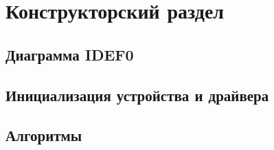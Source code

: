 \section{Конструкторский раздел}

\subsection{Диаграмма IDEF0}

\subsection{Инициализация устройства и драйвера}

\subsection{Алгоритмы}
